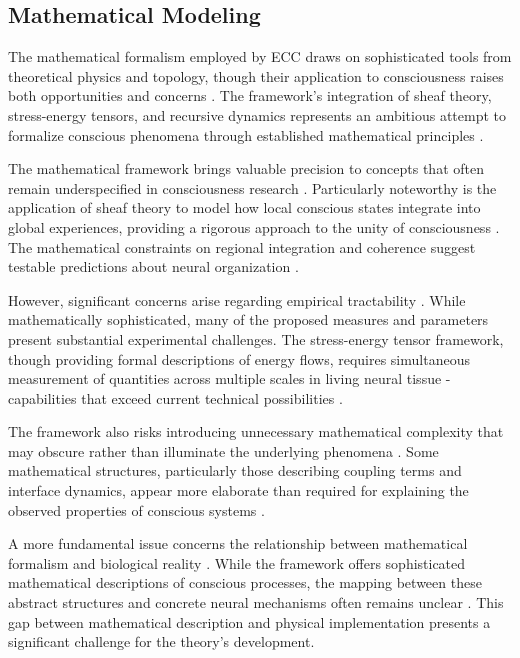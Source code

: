 \begin{refsection}
\subsection{Mathematical Modeling}

The mathematical formalism employed by ECC draws on sophisticated tools from theoretical physics and topology, though their application to consciousness raises both opportunities and concerns \cite{rosen2012anticipatory, langer2009philosophy}. The framework's integration of sheaf theory, stress-energy tensors, and recursive dynamics represents an ambitious attempt to formalize conscious phenomena through established mathematical principles \cite{varela2016embodied}.

The mathematical framework brings valuable precision to concepts that often remain underspecified in consciousness research \cite{thompson2014waking}. Particularly noteworthy is the application of sheaf theory to model how local conscious states integrate into global experiences, providing a rigorous approach to the unity of consciousness \cite{zahavi2014self}. The mathematical constraints on regional integration and coherence suggest testable predictions about neural organization \cite{feinberg2016ancient}.

However, significant concerns arise regarding empirical tractability \cite{koch2019feeling}. While mathematically sophisticated, many of the proposed measures and parameters present substantial experimental challenges. The stress-energy tensor framework, though providing formal descriptions of energy flows, requires simultaneous measurement of quantities across multiple scales in living neural tissue - capabilities that exceed current technical possibilities \cite{deacon2011incomplete}.

The framework also risks introducing unnecessary mathematical complexity that may obscure rather than illuminate the underlying phenomena \cite{dennett2017bacteria}. Some mathematical structures, particularly those describing coupling terms and interface dynamics, appear more elaborate than required for explaining the observed properties of conscious systems \cite{merleau2012phenomenology}.

A more fundamental issue concerns the relationship between mathematical formalism and biological reality \cite{churchland2013touching}. While the framework offers sophisticated mathematical descriptions of conscious processes, the mapping between these abstract structures and concrete neural mechanisms often remains unclear \cite{noe2009out}. This gap between mathematical description and physical implementation presents a significant challenge for the theory's development.


\end{refsection}
